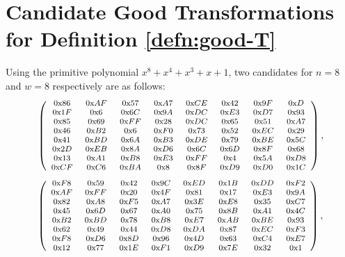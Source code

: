 \section{Candidate Good Transformations for Definition \ref{defn:good-T}}
\label{sec:candidates-good-linear}

Using the primitive polynomial $x^8+x^4+x^3+x+1$, two candidates for $n = 8$ and $w = 8$ respectively are as follows:
\small
\[\footnotesize
\left(
\begin{array}{cccccccc}
\text{0x}86~& \text{0x}AF~& \text{0x}57~& \text{0x}A7~& \text{0x}CE~& \text{0x}42~& \text{0x}9F~& \text{0x}D\\
\text{0x}1F~& \text{0x}6~& \text{0x}6C~& \text{0x}9A~& \text{0x}DC~& \text{0x}E3~& \text{0x}D7~& \text{0x}93\\
\text{0x}85~& \text{0x}69~& \text{0x}FF~& \text{0x}28~& \text{0x}DC~& \text{0x}65~& \text{0x}51~& \text{0x}A7\\
\text{0x}46~& \text{0x}B2~& \text{0x}6~& \text{0x}F0~& \text{0x}73~& \text{0x}52~& \text{0x}EC~& \text{0x}29\\
\text{0x}41~& \text{0x}BD~& \text{0x}6A~& \text{0x}B3~& \text{0x}DE~& \text{0x}79~& \text{0x}BE~& \text{0x}5C\\
\text{0x}2D~& \text{0x}EB~& \text{0x}8A~& \text{0x}D6~& \text{0x}6C~& \text{0x}6D~& \text{0x}8F~& \text{0x}68\\
\text{0x}13~& \text{0x}A1~& \text{0x}B8~& \text{0x}E3~& \text{0x}FF~& \text{0x}4~& \text{0x}5A~& \text{0x}D8\\
\text{0x}CF~& \text{0x}C6~& \text{0x}BA~& \text{0x}8~& \text{0x}8F~& \text{0x}D9~& \text{0x}D0~& \text{0x}1C
\end{array}
\right),
\]
\[\footnotesize
\left(
\begin{array}{cccccccc}
\text{0x}F8~& \text{0x}59~& \text{0x}42~& \text{0x}9C~& \text{0x}ED~& \text{0x}1B~& \text{0x}DD~& \text{0x}F2\\
\text{0x}AF~& \text{0x}FF~& \text{0x}20~& \text{0x}4F~& \text{0x}81~& \text{0x}17~& \text{0x}E3~& \text{0x}9A\\
\text{0x}82~& \text{0x}A8~& \text{0x}F5~& \text{0x}A7~& \text{0x}3E~& \text{0x}E8~& \text{0x}35~& \text{0x}C7\\
\text{0x}45~& \text{0x}6D~& \text{0x}67~& \text{0x}A0~& \text{0x}75~& \text{0x}8B~& \text{0x}A1~& \text{0x}4C\\
\text{0x}B2~& \text{0x}BD~& \text{0x}78~& \text{0x}B8~& \text{0x}E7~& \text{0x}AB~& \text{0x}BE~& \text{0x}93\\
\text{0x}62~& \text{0x}49~& \text{0x}44~& \text{0x}D8~& \text{0x}DA~& \text{0x}87~& \text{0x}EC~& \text{0x}F3\\
\text{0x}F8~& \text{0x}D6~& \text{0x}8D~& \text{0x}96~& \text{0x}4D~& \text{0x}63~& \text{0x}C4~& \text{0x}E7\\
\text{0x}12~& \text{0x}77~& \text{0x}1E~& \text{0x}F1~& \text{0x}D9~& \text{0x}7E~& \text{0x}32~& \text{0x}1
\end{array}
\right),
\]

